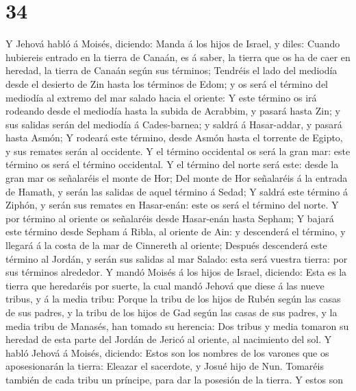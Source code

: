 \hypertarget{section-33}{%
\section{34}\label{section-33}}

 Y Jehová habló á Moisés, diciendo:  Manda á
los hijos de Israel, y diles: Cuando hubiereis entrado en la tierra de
Canaán, es á saber, la tierra que os ha de caer en heredad, la tierra de
Canaán según sus términos;  Tendréis el lado del mediodía
desde el desierto de Zin hasta los términos de Edom; y os será el
término del mediodía al extremo del mar salado hacia el oriente:
 Y este término os irá rodeando desde el mediodía hasta la
subida de Acrabbim, y pasará hasta Zin; y sus salidas serán del mediodía
á Cades-barnea; y saldrá á Hasar-addar, y pasará hasta Asmón;
 Y rodeará este término, desde Asmón hasta el torrente de
Egipto, y sus remates serán al occidente.  Y el término
occidental os será la gran mar: este término os será el término
occidental.  Y el término del norte será este: desde la
gran mar os señalaréis el monte de Hor;  Del monte de Hor
señalaréis á la entrada de Hamath, y serán las salidas de aquel término
á Sedad;  Y saldrá este término á Ziphón, y serán sus
remates en Hasar-enán: este os será el término del norte.
 Y por término al oriente os señalaréis desde Hasar-enán
hasta Sepham;  Y bajará este término desde Sepham á
Ribla, al oriente de Ain: y descenderá el término, y llegará á la costa
de la mar de Cinnereth al oriente;  Después descenderá
este término al Jordán, y serán sus salidas al mar Salado: esta será
vuestra tierra: por sus términos alrededor.  Y mandó
Moisés á los hijos de Israel, diciendo: Esta es la tierra que heredaréis
por suerte, la cual mandó Jehová que diese á las nueve tribus, y á la
media tribu:  Porque la tribu de los hijos de Rubén según
las casas de sus padres, y la tribu de los hijos de Gad según las casas
de sus padres, y la media tribu de Manasés, han tomado su herencia:
 Dos tribus y media tomaron su heredad de esta parte del
Jordán de Jericó al oriente, al nacimiento del sol.  Y
habló Jehová á Moisés, diciendo:  Estos son los nombres
de los varones que os aposesionarán la tierra: Eleazar el sacerdote, y
Josué hijo de Nun.  Tomaréis también de cada tribu un
príncipe, para dar la posesión de la tierra.  Y estos son
